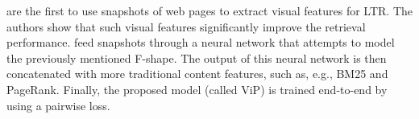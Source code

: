 \citet{fan2017learning} are the first to use snapshots of web pages to extract visual features for LTR.
The authors show that such visual features significantly improve the retrieval performance.
\citet{fan2017learning} feed snapshots through a neural network that attempts to model the previously mentioned F-shape.
The output of this neural network is then concatenated with more traditional content features, such as, e.g., BM25 and PageRank.
Finally, the proposed model (called ViP) is trained end-to-end by using a pairwise loss.



